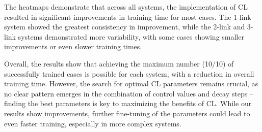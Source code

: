 The heatmaps demonstrate that across all systems, the implementation of CL resulted in significant improvements in training time for most cases. The 1-link system showed the greatest consistency in improvement, while the 2-link and 3-link systems demonstrated more variability, with some cases showing smaller improvements or even slower training times.

Overall, the results show that achieving the maximum number (10/10) of successfully trained cases is possible for each system, with a reduction in overall training time. However, the search for optimal CL parameters remains crucial, as no clear pattern emerges in the combination of control values and decay steps -- finding the best parameters is key to maximizing the benefits of CL. While our results show improvements, further fine-tuning of the parameters could lead to even faster training, especially in more complex systems.